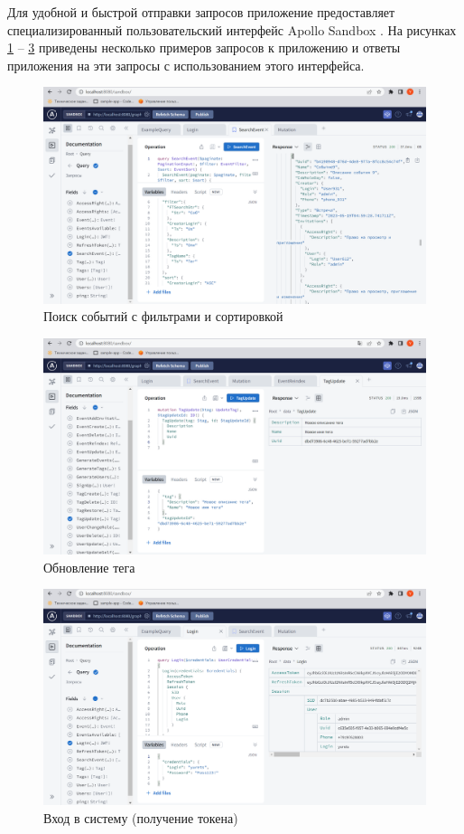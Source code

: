 Для удобной и быстрой отправки запросов приложение предоставляет специализированный пользовательский интерфейс Apollo Sandbox \cite{sandbox}. На рисунках \ref{fig:search-events} -- \ref{fig:login} приведены несколько примеров запросов к приложению и ответы приложения на эти запросы с использованием этого интерфейса.

\begin{figure}[ht!]
	\centering
	\includegraphics[width=1\linewidth]{assets/images/SearchEvents.png}
	\caption{Поиск событий с фильтрами и сортировкой}
	\label{fig:search-events}
\end{figure}

\begin{figure}[ht!]
	\centering
	\includegraphics[width=1\linewidth]{assets/images/Tags.png}
	\caption{Обновление тега}
	\label{fig:tag}
\end{figure}

\begin{figure}[ht!]
	\centering
	\includegraphics[width=1\linewidth]{assets/images/Login.png}
	\caption{Вход в систему (получение токена)}
	\label{fig:login}
\end{figure}


